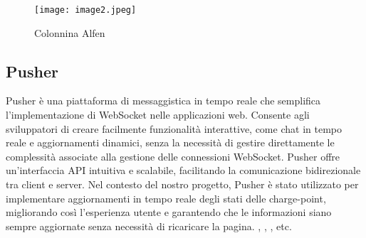 \begin{figure}[h]
    \centering
    \texttt{[image: image2.jpeg]}
    \caption{Colonnina Alfen}
    \label{fig:collonina_alfen} 
\end{figure}

\subsection{Pusher}
Pusher è una piattaforma di messaggistica in tempo reale che semplifica l'implementazione di WebSocket nelle applicazioni web. Consente agli sviluppatori di creare facilmente funzionalità interattive, come chat in tempo reale e aggiornamenti dinamici, senza la necessità di gestire direttamente le complessità associate alla gestione delle connessioni WebSocket. Pusher offre un'interfaccia API intuitiva e scalabile, facilitando la comunicazione bidirezionale tra client e server. Nel contesto del nostro progetto, Pusher è stato utilizzato per implementare aggiornamenti in tempo reale degli stati delle charge-point, migliorando così l'esperienza utente e garantendo che le informazioni siano sempre aggiornate senza necessità di ricaricare la pagina.
\cite{ocpi}, \cite{laravel}, \cite{vuejs}, etc.
